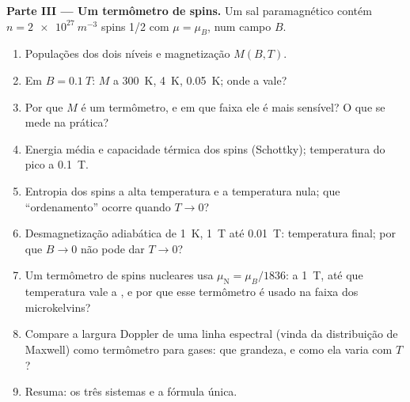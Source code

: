\begin{problem}
\textbf{Parte III --- Um termômetro de spins.}
Um sal paramagnético contém $n = \qty{2e27}{m^{-3}}$ spins 1/2 com $\mu
= \mu_B$, num campo $B$.
\begin{enumerate}[resume]
  \item Populações dos dois níveis e magnetização
        $M(B,T)$.
  \item Em $B = \qty{0.1}{T}$: $M$ a \qty{300}{K}, \qty{4}{K}, \qty{0.05}{K};
        onde a  vale?
  \item Por que $M$ é um termômetro, e em que faixa ele é mais
        sensível? O que se mede na prática?
  \item Energia média e capacidade térmica dos spins (Schottky);
        temperatura do pico a \qty{0.1}{T}.
  \item Entropia dos spins a alta temperatura e a temperatura nula; que
        ``ordenamento'' ocorre quando $T \to 0$?
  \item Desmagnetização adiabática de \qty{1}{K}, \qty{1}{T} até \qty{0.01}{T}:
        temperatura final; por que $B \to 0$ não pode dar $T \to 0$?
  \item Um termômetro de spins nucleares usa $\mu_{\text{N}} = \mu_B/1836$: a
        \qty{1}{T}, até que temperatura vale a , e
        por que esse termômetro é usado na faixa dos microkelvins?
  \item Compare a largura Doppler de uma linha espectral (vinda da
        distribuição de Maxwell) como termômetro para gases: que grandeza, e
        como ela varia com $T$?
  \item Resuma: os três sistemas e a fórmula única.
\end{enumerate}
\end{problem}
